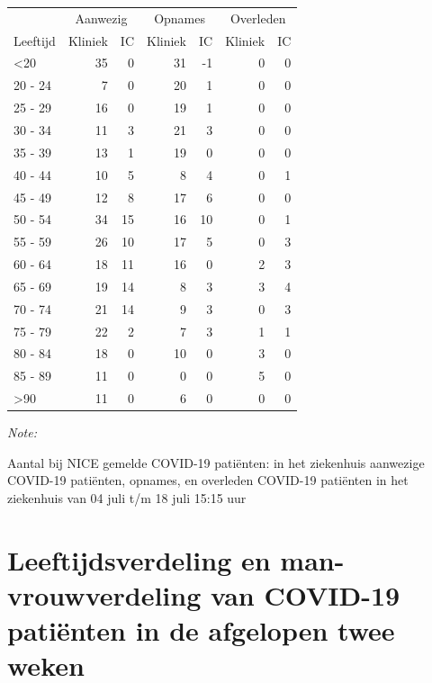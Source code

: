\documentclass[
  english,
  man,floatsintext]{apa6}
\begin{document}
\begin{table}
\centering\begingroup\fontsize{10}{12}\selectfont

\begin{threeparttable}
\begin{tabular}{lrrrrrr}
\toprule
\multicolumn{1}{c}{ } & \multicolumn{2}{c}{Aanwezig} & \multicolumn{2}{c}{Opnames} & \multicolumn{2}{c}{Overleden} \\
\cmidrule(l{3pt}r{3pt}){2-3} \cmidrule(l{3pt}r{3pt}){4-5} \cmidrule(l{3pt}r{3pt}){6-7}
Leeftijd & Kliniek & IC & Kliniek & IC & Kliniek & IC\\
\midrule
<20 & 35 & 0 & 31 & -1 & 0 & 0\\
20 - 24 & 7 & 0 & 20 & 1 & 0 & 0\\
25 - 29 & 16 & 0 & 19 & 1 & 0 & 0\\
30 - 34 & 11 & 3 & 21 & 3 & 0 & 0\\
35 - 39 & 13 & 1 & 19 & 0 & 0 & 0\\
40 - 44 & 10 & 5 & 8 & 4 & 0 & 1\\
45 - 49 & 12 & 8 & 17 & 6 & 0 & 0\\
50 - 54 & 34 & 15 & 16 & 10 & 0 & 1\\
55 - 59 & 26 & 10 & 17 & 5 & 0 & 3\\
60 - 64 & 18 & 11 & 16 & 0 & 2 & 3\\
65 - 69 & 19 & 14 & 8 & 3 & 3 & 4\\
70 - 74 & 21 & 14 & 9 & 3 & 0 & 3\\
75 - 79 & 22 & 2 & 7 & 3 & 1 & 1\\
80 - 84 & 18 & 0 & 10 & 0 & 3 & 0\\
85 - 89 & 11 & 0 & 0 & 0 & 5 & 0\\
>90 & 11 & 0 & 6 & 0 & 0 & 0\\
\bottomrule
\end{tabular}
\begin{tablenotes}
\item \textit{Note: } 
\item Aantal bij NICE gemelde COVID-19 patiënten: in het ziekenhuis aanwezige COVID-19 patiënten, opnames, en overleden COVID-19 patiënten in het ziekenhuis van 04 juli t/m 18 juli 15:15 uur
\end{tablenotes}
\end{threeparttable}
\endgroup{}
\end{table}

\newpage

\hypertarget{leeftijdsverdeling-en-man-vrouwverdeling-van-covid-19-patiuxebnten-in-de-afgelopen-twee-weken}{%
\section{Leeftijdsverdeling en man-vrouwverdeling van COVID-19 patiënten in de afgelopen twee weken}\label{leeftijdsverdeling-en-man-vrouwverdeling-van-covid-19-patiuxebnten-in-de-afgelopen-twee-weken}}
\end{document}

